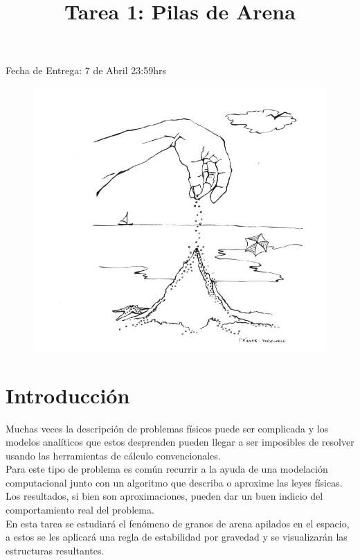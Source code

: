 \documentclass[dcc]{fcfmcourse}
\title{Tarea 1: Pilas de Arena}
\begin{document}
\maketitle
\vspace{-2ex}
\begin{center}
Fecha de Entrega: 7 de Abril 23:59hrs
\end{center}

\begin{figure}[h!]
    \centering
    \includegraphics[scale=0.8]{imagenes/sanpile.jpg}
\end{figure}

\section{Introducción}
Muchas veces la descripción de problemas físicos puede ser complicada y los modelos analíticos que estos desprenden pueden llegar a ser imposibles de resolver usando las herramientas de cálculo convencionales. \\

Para este tipo de problema es común recurrir a la ayuda de una modelación computacional junto con un algoritmo que describa o aproxime las leyes físicas. Los resultados, si bien son aproximaciones, pueden dar un buen indicio del comportamiento real del problema. \\

En esta tarea se estudiará el fenómeno de granos de arena apilados en el espacio, a estos se les aplicará una regla de estabilidad por gravedad y se visualizarán las estructuras resultantes.
\end{document}
